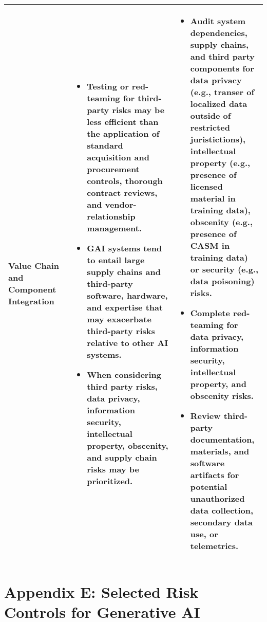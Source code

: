 \documentclass[fleqn]{article}
\begin{document}
\begin{table}[H]
\begin{tabular}{|m{0.25\linewidth} |m{0.40\linewidth} | m{0.35\linewidth} |}
		\hline
		Value Chain and Component Integration &
		\begin{itemize}[noitemsep, leftmargin=*] 
			\item Testing or red-teaming for third-party risks may be less efficient than the application of standard acquisition and procurement controls, thorough contract reviews, and vendor-relationship management.
			\item GAI systems tend to entail large supply chains and third-party software, hardware, and expertise that may exacerbate third-party risks relative to other AI systems. 
			\item When considering third party risks, data privacy, information security, intellectual property, obscenity, and supply chain risks may be prioritized.
		\end{itemize} 
		& 
		\begin{itemize}[noitemsep, leftmargin=*] 
			\item Audit system dependencies, supply chains, and third party components for data privacy (e.g., transer of localized data outside of restricted juristictions), intellectual property (e.g., presence of licensed material in training data), obscenity (e.g., presence of CASM in training data) or security (e.g., data poisoning) risks.
			\item Complete red-teaming for data privacy, information security, intellectual property, and obscenity risks.
			\item Review third-party documentation, materials, and software artifacts for potential unauthorized data collection, secondary data use, or telemetrics.
		\end{itemize} \\
		\hline
	\end{tabular}
\end{table}

\section*{Appendix E: Selected Risk Controls for Generative AI}\label{sec:appndxe}
\end{document}
